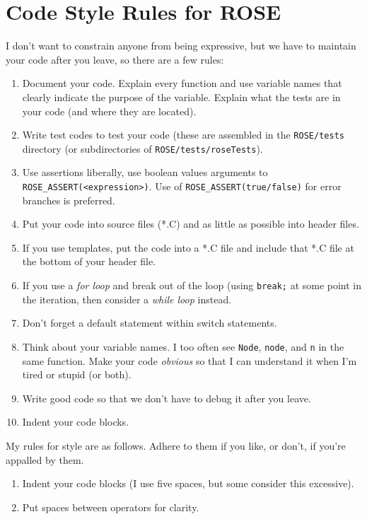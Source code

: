 \section{Code Style Rules for ROSE}

   I don't want to constrain anyone from being expressive, but
we have to maintain your code after you leave, so there are a few rules:
\begin{enumerate}
   \item Document your code.
         Explain every function and use variable names that clearly indicate the purpose of
         the variable. Explain what the tests are in your code (and where they are located).
   \item Write test codes to test your code (these are assembled in the {\tt ROSE/tests}
         directory (or subdirectories of {\tt ROSE/tests/roseTests}).
   \item Use assertions liberally, use boolean values arguments to 
         {\tt ROSE\_ASSERT(<expression>)}. Use of {\tt ROSE\_ASSERT(true/false)} for
         error branches is preferred.
   \item Put your code into source files (*.C) and as little as possible into header files.
   \item If you use templates, put the code into a *.C file and include that *.C file
         at the bottom of your header file.
   \item If you use a {\em for loop} and break out of the loop (using {\tt break;} 
         at some point in the iteration, then consider a {\em while loop} instead.
   \item Don't forget a default statement within switch statements.
   \item Think about your variable names. I too often see {\tt Node}, {\tt node}, 
         and {\tt n} in the same function.  Make your code {\em obvious} so that I can understand it when I'm tired
         or stupid (or both).
   \item Write good code so that we don't have to debug it after you leave.
   \item Indent your code blocks.
\end{enumerate}

My rules for style are as follows. Adhere to them if you like, or don't, if you're
    appalled by them.
\begin{enumerate}
   \item Indent your code blocks (I use five spaces, but some consider this excessive).
   \item Put spaces between operators for clarity.
\end{enumerate}




